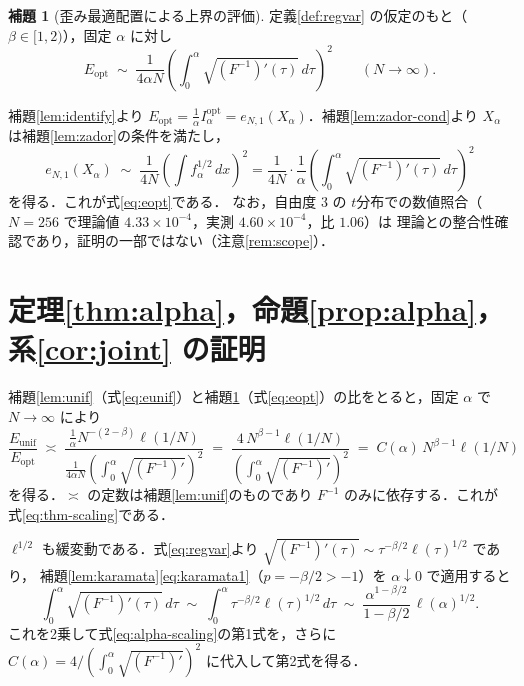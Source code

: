 \documentclass[a4paper,10pt]{jsarticle}
\makeatletter
\theoremstyle{definition}
\newtheorem{lemma}{補題}[section]
\renewenvironment{proof}[1][\proofname]{\par
  \pushQED{\qed}%
  \normalfont \topsep6\p@\@plus6\p@\relax
  \trivlist
  \item[\hskip\labelsep\textbf{#1}]\ignorespaces
}{%
  \popQED\endtrivlist\@endpefalse
}
\renewcommand{\proofname}{証明}
\newcommand{\Finv}{F^{-1}}
\newcommand{\eN}{e_{N,1}}
\newcommand{\Eunif}{E_{\mathrm{unif}}}
\newcommand{\Eopt}{E_{\mathrm{opt}}}
\newcommand{\Iopt}{I_\alpha^{\mathrm{opt}}}
\makeatother
\begin{document}
\begin{lemma}[歪み最適配置による上界の評価]
\label{lem:opt}
定義\ref{def:regvar} の仮定のもと（$\beta\in[1,2)$），固定 $\alpha$ に対し
\begin{equation}
  \Eopt\;\sim\;\frac1{4\alpha N}\left(\int_0^\alpha\sqrt{(\Finv)'(\tau)}\,d\tau\right)^{2}
  \qquad(N\to\infty).
  \label{eq:eopt}
\end{equation}
\end{lemma}
\begin{proof}
補題\ref{lem:identify}より $\Eopt=\frac1\alpha\Iopt=\eN(X_\alpha)$．補題\ref{lem:zador-cond}より $X_\alpha$ は補題\ref{lem:zador}の条件を満たし，
\begin{equation*}
\eN(X_\alpha)\;\sim\;\frac1{4N}\left(\int f_\alpha^{1/2}\,dx\right)^{2}
=\frac1{4N}\cdot\frac1\alpha\left(\int_0^\alpha\sqrt{(\Finv)'(\tau)}\,d\tau\right)^{2}
\end{equation*}
を得る．これが式\eqref{eq:eopt}である．
なお，自由度 $3$ の $t$分布での数値照合（$N=256$ で理論値 $4.33\times10^{-4}$，実測 $4.60\times10^{-4}$，比 $1.06$）は
理論との整合性確認であり，証明の一部ではない（注意\ref{rem:scope}）．
\end{proof}

\section{定理\ref{thm:alpha}，命題\ref{prop:alpha}，系\ref{cor:joint} の証明}
\label{sec:proofs}

\begin{proof}[定理\ref{thm:alpha} の証明]
補題\ref{lem:unif}（式\eqref{eq:eunif}）と補題\ref{lem:opt}（式\eqref{eq:eopt}）の比をとると，固定 $\alpha$ で $N\to\infty$ により
\begin{equation*}
  \frac{\Eunif}{\Eopt}
  \;\asymp\;\frac{\frac1\alpha N^{-(2-\beta)}\ell(1/N)}{\frac1{4\alpha N}\left(\int_0^\alpha\sqrt{(\Finv)'}\right)^{2}}
  \;=\;\frac{4\,N^{\beta-1}\ell(1/N)}{\left(\int_0^\alpha\sqrt{(\Finv)'}\right)^{2}}
  \;=\;C(\alpha)\,N^{\beta-1}\ell(1/N)
\end{equation*}
を得る．$\asymp$ の定数は補題\ref{lem:unif}のものであり $\Finv$ のみに依存する．これが式\eqref{eq:thm-scaling}である．
\end{proof}

\begin{proof}[命題\ref{prop:alpha} の証明]
$\ell^{1/2}$ も緩変動である．式\eqref{eq:regvar}より $\sqrt{(\Finv)'(\tau)}\sim\tau^{-\beta/2}\ell(\tau)^{1/2}$ であり，
補題\ref{lem:karamata}\eqref{eq:karamata1}（$p=-\beta/2>-1$）を $\alpha\downarrow0$ で適用すると
\begin{equation*}
\int_0^\alpha\sqrt{(\Finv)'(\tau)}\,d\tau
\;\sim\;\int_0^\alpha\tau^{-\beta/2}\ell(\tau)^{1/2}\,d\tau
\;\sim\;\frac{\alpha^{1-\beta/2}}{1-\beta/2}\,\ell(\alpha)^{1/2}.
\end{equation*}
これを2乗して式\eqref{eq:alpha-scaling}の第1式を，さらに $C(\alpha)=4/(\int_0^\alpha\sqrt{(\Finv)'})^2$ に代入して第2式を得る．
\end{proof}
\end{document}
